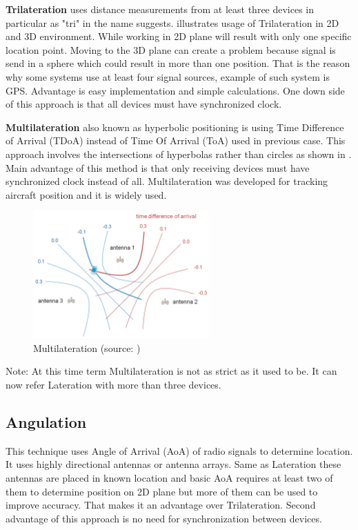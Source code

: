 \textbf{Trilateration} uses distance measurements from at least three devices in particular as "tri" in the name suggests.\cite{RAinWILTaS}  illustrates usage of Trilateration in 2D and 3D environment. While working in 2D plane will result with only one specific location point. Moving to the 3D plane can create a problem because signal is send in a sphere which could result in more than one position. That is the reason why some systems use at least four signal sources, example of such system is GPS.\cite{GNSSGPS} Advantage is easy implementation and simple calculations. One down side of this approach is that all devices must have synchronized clock.\cite{RAinWILTaS}

\medskip

\textbf{Multilateration} also known as hyperbolic positioning is using Time Difference of Arrival (TDoA) instead of Time Of Arrival (ToA) used in previous case. This approach involves the intersections of hyperbolas rather than circles as shown in . Main advantage of this method is that only receiving devices must have synchronized clock instead of all.\cite{PLTaA} Multilateration was developed for tracking aircraft position and it is widely used.

\begin{figure}[h!]
	\begin{centering}
		\includegraphics[width=0.6\textwidth]{img/multilateration}
		\par\end{centering}
	\caption{Multilateration (source: \cite{HPwAA})\label{fig:Multilateration}}
	\label{fig3}
\end{figure}

Note: At this time term Multilateration is not as strict as it used to be. It can now refer Lateration with more than three devices.

\subsection{Angulation}\label{sec:Angulation}
This technique uses Angle of Arrival (AoA) of radio signals to determine location. It uses highly directional antennas or antenna arrays. Same as Lateration these antennas are placed in known location and basic AoA requires at least two of them to determine position on 2D plane but more of them can be used to improve accuracy.\cite{RAinWILTaS} That makes it an advantage over Trilateration. Second advantage of this approach is no need for synchronization between devices.

